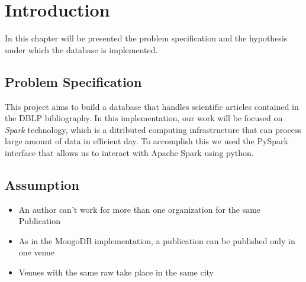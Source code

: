 \documentclass{Configuration_Files/PoliMi3i_thesis}
\begin{document}
\mainmatter %

\chapter{Introduction}
\label{ch:introduction}
In this chapter will be presented the problem specification and the hypothesis under which the database is implemented.

\section{Problem Specification}
This project aims to build a database that handles scientific articles contained in the DBLP bibliography. In this implementation,
our work will be focused on \emph{Spark} technology, which is a ditributed computing infrastructure that can process large amount of data in efficient day. To accomplish this we used the PySpark interface that allows us to interact with Apache Spark using python. 

\section{Assumption}
\begin{itemize}
    \item An author can't work for more than one organization for the same Publication
    \item As in the MongoDB implementation, a publication can be published only in one venue
    \item Venues with the same raw take place in the same city
\end{itemize}
\end{document}
